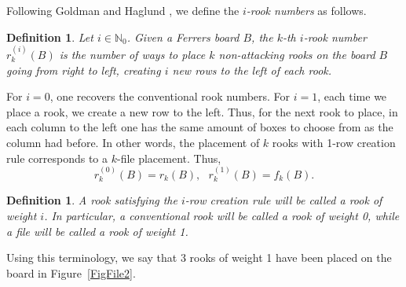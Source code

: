 \documentclass[10pt]{amsart}
\newtheorem{definition}[theorem]{Definition}
\begin{document}
Following Goldman and Haglund \cite{JGJH2000}, we define the {\em $i$-rook numbers} as follows.
\begin{definition} Let $i\in \mathbb{N}_0$. Given a Ferrers board $B$, the {\em $k$-th $i$-rook number} $r_k^{(i)}(B)$ is the number of ways to place $k$ non-attacking rooks on the board $B$ going from right to left, creating $i$ new rows to the left of each rook.  
\end{definition}
For $i=0$, one recovers the conventional rook numbers. For $i=1$, each time we place a rook, we create a new row to the left. Thus, for the next rook to place, in each column to the left one has the same amount of boxes to choose from as the column had before. In other words, the placement of $k$ rooks with 1-row creation rule corresponds to a $k$-file placement. Thus,  
\begin{equation}\label{RookRed}
r_k^{(0)}(B)=r_k(B), \,\,\,\, r_k^{(1)}(B)=f_k(B). 
\end{equation}
\begin{definition}A rook satisfying the $i$-row creation rule will be called a {\em rook of weight $i$}. In particular, a conventional rook will be called a rook of weight 0, while a file will be called a rook of weight 1. 
\end{definition}
Using this terminology, we say that 3 rooks of weight 1 have been placed on the board in Figure~\ref{FigFile2}.
\end{document}
